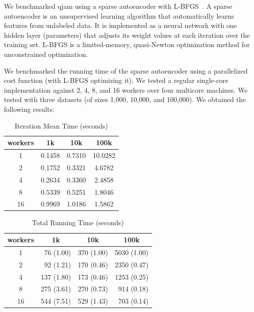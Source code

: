 \documentclass[%
  final,
  notitlepage,
  narroweqnarray,
  inline,
]{ieee}
\begin{document}
We benchmarked qjam using a sparse autoencoder with L-BFGS~\cite{lbfgs}. A
sparse autoencoder is an unsupervised learning algorithm that automatically
learns features from unlabeled data. It is implemented as a neural network with
one hidden layer (parameters) that adjusts its weight values at each iteration
over the training set. L-BFGS is a limited-memory, quasi-Newton optimization
method for unconstrained optimization.

We benchmarked the running time of the sparse autoencoder using a parallelized
cost function (with L-BFGS optimizing it). We tested a regular single-core
implementation against 2, 4, 8, and 16 workers over four multicore machines. We
tested with three datasets (of sizes 1,000, 10,000, and 100,000). We obtained
the following results:

\begin{table}[htbp]
  \label{table_iteration_mean_time}
  \caption{Iteration Mean Time (seconds)}
  \begin{center}
    \begin{tabular}{cccc}
    workers  & 1k  &  10k   & 100k   \\
      \hline
    1  & 0.1458 & 0.7310 & 10.0282 \\
    2  & 0.1752 & 0.3321 & 4.6782 \\
    4  & 0.2634 & 0.3360 & 2.4858 \\
    8  & 0.5339 & 0.5251 & 1.8046 \\
    16 & 0.9969 & 1.0186 & 1.5862 \\
    \end{tabular}
  \end{center}
\end{table}


\begin{table}[htbp]
  \label{table_total_running_time}
  \caption{Total Running Time (seconds)}
  \begin{center}
    \begin{tabular}{crrr}
    workers  & \multicolumn{1}{c}{1k} & \multicolumn{1}{c}{10k}
             & \multicolumn{1}{c}{100k} \\
      \hline
    1  &  76  (1.00) & 370 (1.00) & 5030 (1.00) \\
    2  &  92  (1.21) & 170 (0.46) & 2350 (0.47) \\
    4  & 137  (1.80) & 173 (0.46) & 1253 (0.25) \\
    8  & 275  (3.61) & 270 (0.73) & 914  (0.18) \\
    16 & 544  (7.51) & 529 (1.43) & 703  (0.14) \\
    \end{tabular}
  \end{center}
\end{table}
\end{document}
